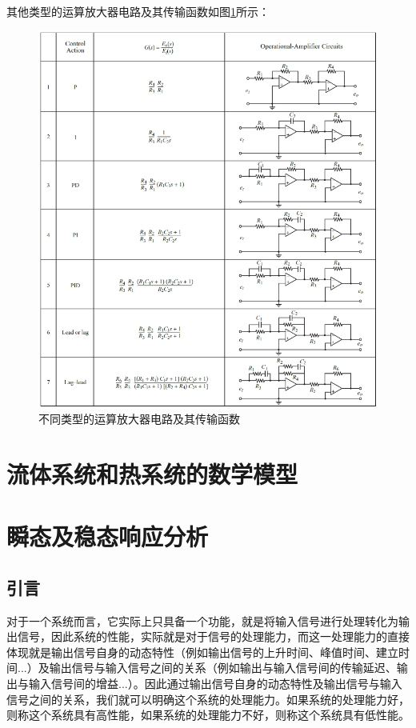 \documentclass{article}
\numberwithin{equation}{section}
\numberwithin{figure}{section}
\begin{document}
其他类型的运算放大器电路及其传输函数如图\ref{circuittable3-1}所示：
\begin{figure}
    \centering
    \includegraphics[width=1\textwidth]{Chapter3/table.png} %
    \caption{不同类型的运算放大器电路及其传输函数} %
    \label{circuittable3-1} %
\end{figure}

\newpage

\section{流体系统和热系统的数学模型}

\newpage

\section{瞬态及稳态响应分析}
\subsection{引言}

对于一个系统而言，它实际上只具备一个功能，就是将输入信号进行处理转化为输出信号，因此系统的性能，实际就是对于信号的处理能力，而这一处理能力的直接体现就是输出信号自身的动态特性（例如输出信号的上升时间、峰值时间、建立时间...）及输出信号与输入信号之间的关系（例如输出与输入信号间的传输延迟、输出与输入信号间的增益...）。因此通过输出信号自身的动态特性及输出信号与输入信号之间的关系，我们就可以明确这个系统的处理能力。如果系统的处理能力好，则称这个系统具有高性能，如果系统的处理能力不好，则称这个系统具有低性能。
\end{document}
